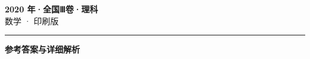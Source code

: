 \documentclass[zihao=5, a4paper]{ctexart}
\begin{document}
\begin{center}
  {\Large\bfseries 2020 年·全国Ⅲ卷·理科}\\[4pt]
  {\large 数学 · 印刷版}
\end{center}
\medskip
{}

\par\bigskip\hrule\bigskip
{}
\Needspace{0.55\textheight}
\begin{center}{\large\bfseries 参考答案与详细解析}\end{center}
\smallskip

\end{document}
